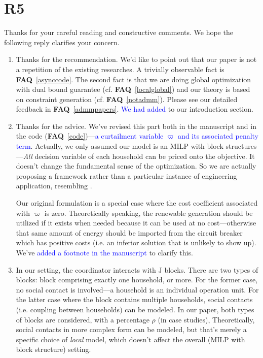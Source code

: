 \documentclass[11pt]{article}
\newcommand{\faq}[1]{\textbf{FAQ}~\ref{#1}}
\newcommand{\blue}[1]{\textcolor{blue}{#1}}
\begin{document}
\section{R5} \label{r5ans}
Thanks for your careful reading and constructive comments. We hope the following reply clarifies your concern.
\begin{enumerate}
    \item \label{r5_1} Thanks for the recommendation.
    We'd like to point out that our paper is not a repetition of the existing researches.
    A trivially observable fact is \faq{asynccode}.
    The second fact is that we are doing global optimization with dual bound guarantee (cf. \faq{localglobal}) and our theory
    is based on constraint generation (cf. \faq{notadmm}).
    Please see our detailed feedback in \faq{admmpapers}.
    \blue{We had added} \cite{wang2023}\cite{wu2025} to our introduction section.
    \item Thanks for the advice. We've revised this part both in the manuscript and in the code (\faq{code})---\blue{a curtailment variable $\varpi$ and its associated penalty term}.
    Actually, we only assumed our model is an MILP with block structures---\textit{All} decision variable of each household can be priced onto the objective. It doesn't change the fundamental sense of the optimization. So we are actually proposing a framework rather than a particular instance of engineering application, resembling \cite{dw2019}.
    \par
    Our original formulation is a special case where the cost coefficient associated with $\varpi$ is zero. Theoretically speaking, the renewable generation should be utilized if it exists when needed because it can be used at no cost---otherwise that same amount of energy should be imported from the circuit breaker which has positive costs (i.e. an inferior solution that is unlikely to show up).
    We've \blue{added a footnote in the manuscript} to clarify this.
    \item \label{r5_3} In our setting, the coordinator interacts with $\mathrm{J}$ blocks.
    There are two types of blocks: block comprising exactly one household, or more.
    For the former case, no social contact is involved---a household is an individual operation unit.
    For the latter case where the block contains multiple households, social contacts (i.e. coupling between households) can be modeled.
    In our paper, both types of blocks are considered, with a percentage $\rho$ (in case studies),
    Theoretically, social contacts in more complex form can be modeled, but that's merely a specific choice of \textit{local} model, which doesn't affect the overall (MILP with block structure) setting.

\end{enumerate}
\end{document}
